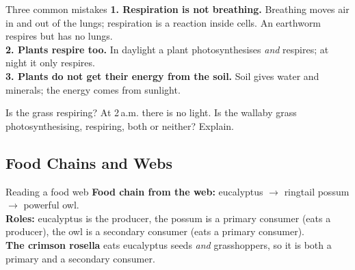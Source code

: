 \begin{workedex}{Three common mistakes}
\textbf{1. Respiration is not breathing.} Breathing moves air in and out of the lungs; respiration is a reaction inside cells. An earthworm respires but has no lungs.\\
\textbf{2. Plants respire too.} In daylight a plant photosynthesises \emph{and} respires; at night it only respires.\\
\textbf{3. Plants do not get their energy from the soil.} Soil gives water and minerals; the energy comes from sunlight.
\end{workedex}

\begin{wedo}{Is the grass respiring?}
At 2\,a.m. there is no light. Is the wallaby grass photosynthesising, respiring, both or neither? Explain.
\answerbox{4cm}
\end{wedo}

\subsection{Food Chains and Webs}\label{sub:6.2}

\begin{center}
\end{center}

\begin{workedex}{Reading a food web}
\textbf{Food chain from the web:} eucalyptus $\rightarrow$ ringtail possum $\rightarrow$ powerful owl.\\
\textbf{Roles:} eucalyptus is the producer, the possum is a primary consumer (eats a producer), the owl is a secondary consumer (eats a primary consumer).\\
\textbf{The crimson rosella} eats eucalyptus seeds \emph{and} grasshoppers, so it is both a primary and a secondary consumer.
\end{workedex}

